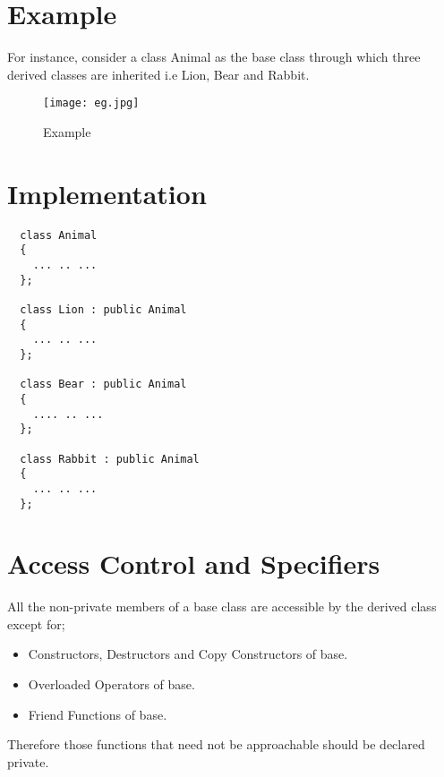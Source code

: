 \documentclass[11pt,fleqn]{book} %
\begin{document}
\newpage
\section{Example}

For instance, consider a class Animal as the base class through which three derived classes are inherited i.e Lion, Bear and Rabbit.

\begin{figure}[h]
  \centering\texttt{[image: eg.jpg]}
  \caption{Example}
\end{figure}
\hfill

\newpage
\section{Implementation}
\begin{lstlisting}
  class Animal 
  {
    ... .. ...
  };

  class Lion : public Animal
  {
    ... .. ...
  };

  class Bear : public Animal
  {
    .... .. ...
  };

  class Rabbit : public Animal 
  {
    ... .. ...
  };
\end{lstlisting}
\hfill 
\section{Access Control and Specifiers}
All the non-private members of a base class are accessible by the derived class except for;

\begin{itemize}
\item Constructors, Destructors and Copy Constructors of base.
\item Overloaded Operators of base.
\item Friend Functions of base.
\end{itemize}
Therefore those functions that need not be approachable should be declared private.
\end{document}
